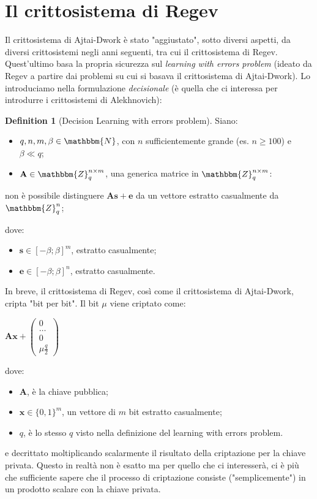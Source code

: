 \documentclass[12pt, a4paper]{report}
\theoremstyle{definition}
\newtheorem{definition}{Definition}[section]
\begin{document}
		\section{Il crittosistema di Regev \cite{17}}
			Il crittosistema di Ajtai-Dwork è stato "aggiustato", sotto diversi aspetti, da diversi crittosistemi negli anni seguenti, tra cui il crittosistema di Regev. Quest'ultimo basa la propria sicurezza sul \emph{learning with errors problem} (ideato da Regev a partire dai problemi su cui si basava il crittosistema di Ajtai-Dwork). Lo introduciamo nella formulazione \emph{decisionale} (è quella che ci interessa per introdurre i crittosistemi di Alekhnovich):
				\begin{definition}[Decision Learning with errors problem]
					Siano:
					\begin{itemize}
						\item $q,n,m,\beta\in\mathbbm{N}$, con $n$ sufficientemente grande (es. $n\geq100$) e $\beta\ll q$;
						\item $\mathbf{A}\in\mathbbm{Z}^{n\times m}_q$, una generica matrice in $\mathbbm{Z}^{n\times m}_q$:
					\end{itemize}
					\begin{center}
						non è possibile distinguere $\mathbf{A}\textbf{s}+\textbf{e}$ da un vettore estratto casualmente da $\mathbbm{Z}^n_q$;
					\end{center}
					dove:
					\begin{itemize}
						\item $\textbf{s}\in[-\beta;\beta]^m$, estratto casualmente;
						\item $\textbf{e}\in[-\beta;\beta]^n$, estratto casualmente.
					\end{itemize}
				\end{definition}
				In breve, il crittosistema di Regev, così come il crittosistema di Ajtai-Dwork, cripta "bit per bit". Il bit $\mu$ viene criptato come:
				\begin{center}
					$\mathbf{A}\textbf{x}+
					\begin{pmatrix}
						0 \\
						\dots \\
						0 \\
						\mu \frac{q}{2}
					\end{pmatrix}$
				\end{center}
				dove:
				\begin{itemize}
					\item $\mathbf{A}$, è la chiave pubblica;
					\item $\textbf{x}\in{\{0,1\}}^m$, un vettore di $m$ bit estratto casualmente;
					\item $q$, è lo stesso $q$ visto nella definizione del learning with errors problem. 
				\end{itemize}
				e decrittato moltiplicando scalarmente il risultato della criptazione per la chiave privata. Questo in realtà non è esatto ma per quello che ci interesserà, ci è più che sufficiente sapere che il processo di criptazione consiste ("semplicemente") in un prodotto scalare con la chiave privata.
				
\end{document}
